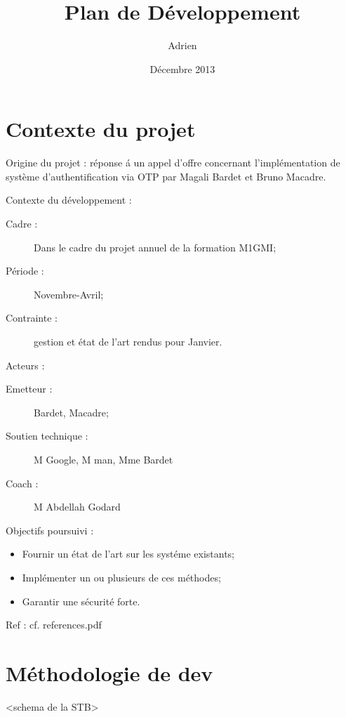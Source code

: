 \documentclass{../../res/univ-projet}
\title{Plan de D\'eveloppement}
\author{Adrien \bsc{Smondack}}
\date{D\'ecembre 2013}
\begin{document}
\maketitle

\section{Contexte du projet}
	Origine du projet : r\'eponse \'a un appel d'offre concernant l'impl\'ementation de syst\`eme d'authentification via OTP par Magali Bardet et Bruno Macadre.
	
	Contexte du d\'eveloppement :
	\begin{description} 
		\item [Cadre :] Dans le cadre du projet annuel de la formation M1GMI;
		\item [P\'eriode :] Novembre-Avril;
		\item [Contrainte :] gestion et \'etat de l'art rendus pour Janvier.
	\end{description}
	Acteurs :
	\begin{description}
		\item [Emetteur :] Bardet, Macadre;
		\item [Soutien technique :] M Google, M man, Mme Bardet
		\item [Coach :] M Abdellah Godard
	\end{description}
	Objectifs poursuivi :
	\begin{itemize}
		\item Fournir un \'etat de l'art sur les syst\'eme existants;
		\item Impl\'ementer un ou plusieurs de ces m\'ethodes;
		\item Garantir une s\'ecurit\'e forte.
	\end{itemize}
	Ref : cf. references.pdf

\section{M\'ethodologie de dev}
	<schema de la STB>
\end{document}
